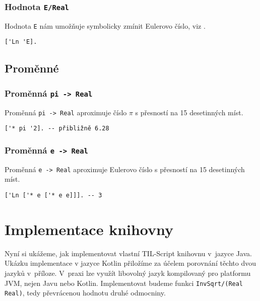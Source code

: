 \subsubsection*{Hodnota \lstinline{E/Real}}

Hodnota \lstinline{E} nám umožňuje symbolicky zmínit Eulerovo číslo,
viz .

\begin{lstlisting}[caption={Ukázka využití E}]
['Ln 'E].
\end{lstlisting}

\subsection{Proměnné}

\subsubsection*{Proměnná \lstinline{pi -> Real}}

Proměnná \lstinline{pi -> Real} aproximuje číslo $\pi$ s přesností na 15 desetinných míst.

\begin{lstlisting}[caption={Ukázka využití proměnné pi}]
['* pi '2]. -- přibližně 6.28
\end{lstlisting}

\subsubsection*{Proměnná \lstinline{e -> Real}}

Proměnná \lstinline{e -> Real} aproximuje Eulerovo číslo s přesností na 15 desetinných míst.

\begin{lstlisting}[caption={Ukázka využití proměnné e}]
['Ln ['* e ['* e e]]]. -- 3
\end{lstlisting}

\section{Implementace knihovny}

Nyní si ukážeme, jak implementovat vlastní TIL-Script knihovnu v~jazyce Java. Ukázku implementace
v jazyce Kotlin přiložíme za účelem porovnání těchto dvou jazyků v~příloze. V~praxi lze využít
libovolný jazyk kompilovaný pro platformu JVM, nejen Javu nebo Kotlin. Implementovat budeme funkci
\lstinline{InvSqrt/(Real Real)}, tedy převrácenou hodnotu druhé odmocniny.


